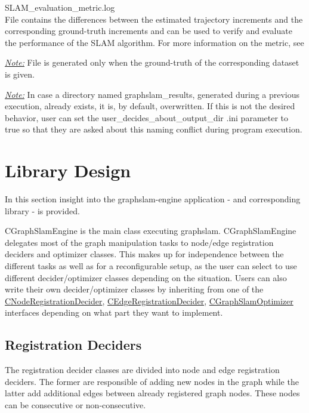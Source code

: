 \begin{description*}
    \item[SLAM\_evaluation\_metric.log]\hfill\\
        File contains the differences between the estimated trajectory increments
        and the corresponding ground-truth increments and can be used to verify and
        evaluate the performance of the SLAM algorithm. For more information on the
        metric, see \cite{Burgard2009}
        
        \ul{\textit{Note:}} File is generated only when the ground-truth of the corresponding
        dataset is given.
\end{description*}

\ul{\textit{Note:}} In case a directory named graphslam\_results, generated during a
previous execution, already exists, it is, by default, overwritten. If this is
not the desired behavior, user can set the user\_decides\_about\_output\_dir
.ini parameter to true so that they are asked about this naming conflict during
program execution.

\section{Library Design}
In this section insight into the graphslam-engine application - and corresponding library - is provided.

CGraphSlamEngine is the main class executing graphslam. CGraphSlamEngine
delegates most of the graph manipulation tasks to node/edge registration
deciders and optimizer classes. This makes up for independence between the
different tasks as well as for a reconfigurable setup, as the user can select
to use different decider/optimizer classes depending on the situation. Users
can also write their own decider/optimizer classes by inheriting from one of
the
\href{http://reference.mrpt.org/devel/classmrpt_1_1graphslam_1_1deciders_1_1_c_node_registration_decider.html}{CNodeRegistrationDecider},
\href{http://reference.mrpt.org/devel/classmrpt_1_1graphslam_1_1deciders_1_1_c_edge_registration_decider.html}{CEdgeRegistrationDecider}, \href{http://reference.mrpt.org/devel/classmrpt_1_1graphslam_1_1optimizers_1_1_c_graph_slam_optimizer.html}{CGraphSlamOptimizer}
interfaces depending on what part they want to implement.

\subsection{Registration Deciders}
The registration decider classes are divided into node and edge registration
deciders. The former are responsible of adding new nodes in the graph while the
latter add additional edges between already registered graph nodes. These nodes can
be consecutive or non-consecutive.

